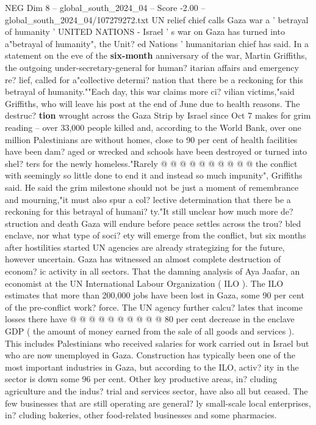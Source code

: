 \begin{textsample}{NEG Dim 8 – global\_south\_2024\_04 – Score -2.00 – global\_south\_2024\_04/107279272.txt}  \label{ex:f8_neg_031}
UN relief chief calls Gaza war a ' betrayal of humanity ' UNITED NATIONS - Israel ' s war on Gaza has turned into a"betrayal of humanity", the Unit? ed Nations ' humanitarian chief has said.
In a statement on the eve of the \textbf{six-month} anniversary of the war, Martin Griffiths, the outgoing under-secretary-general for human? itarian affairs and emergency re? lief, called for a"collective determi? nation that there be a reckoning for this betrayal of humanity.""Each day, this war claims more ci? vilian victims,"said Griffiths, who will leave his post at the end of June due to health reasons.
The destruc? \textbf{tion} wrought across the Gaza Strip by Israel since Oct 7 makes for grim reading -- over 33,000 people killed and, according to the World Bank, over one million Palestinians are without homes, close to 90 per cent of health facilities have been dam? aged or wrecked and schools have been destroyed or turned into shel? ters for the newly homeless."Rarely @ @ @ @ @ @ @ @ @ @ the conflict with seemingly so little done to end it and instead so much impunity", Griffiths said.
He said the grim milestone should not be just a moment of remembrance and mourning,"it must also spur a col? lective determination that there be a reckoning for this betrayal of humani? ty."It still unclear how much more de? struction and death Gaza will endure before peace settles across the trou? bled enclave, nor what type of soci? ety will emerge from the conflict, but six months after hostilities started UN agencies are already strategizing for the future, however uncertain.
Gaza has witnessed an almost complete destruction of econom? ic activity in all sectors.
That the damning analysis of Aya Jaafar, an economist at the UN International Labour Organization ( ILO ).
The ILO estimates that more than 200,000 jobs have been lost in Gaza, some 90 per cent of the pre-conflict work? force.
The UN agency further calcu? lates that income losses there have @ @ @ @ @ @ @ @ @ @ 80 per cent decrease in the enclave GDP ( the amount of money earned from the sale of all goods and services ).
This includes Palestinians who received salaries for work carried out in Israel but who are now unemployed in Gaza.
Construction has typically been one of the most important industries in Gaza, but according to the ILO, activ? ity in the sector is down some 96 per cent.
Other key productive areas, in? cluding agriculture and the indus? trial and services sector, have also all but ceased.
The few businesses that are still operating are general? ly small-scale local enterprises, in? cluding bakeries, other food-related businesses and some pharmacies.

\end{textsample}
